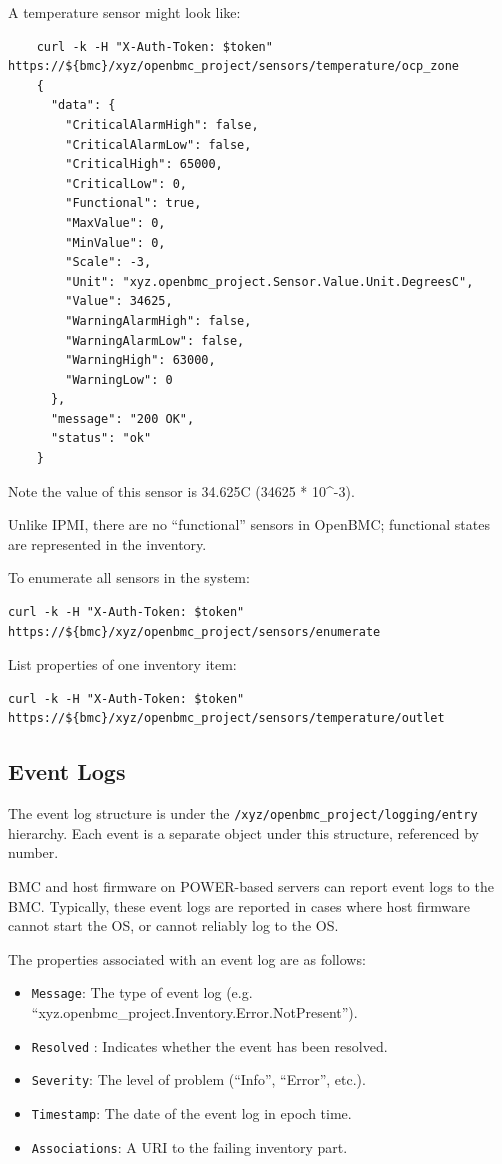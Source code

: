 A temperature sensor might look like:

\begin{verbatim}
    curl -k -H "X-Auth-Token: $token" https://${bmc}/xyz/openbmc_project/sensors/temperature/ocp_zone
    {
      "data": {
        "CriticalAlarmHigh": false,
        "CriticalAlarmLow": false,
        "CriticalHigh": 65000,
        "CriticalLow": 0,
        "Functional": true,
        "MaxValue": 0,
        "MinValue": 0,
        "Scale": -3,
        "Unit": "xyz.openbmc_project.Sensor.Value.Unit.DegreesC",
        "Value": 34625,
        "WarningAlarmHigh": false,
        "WarningAlarmLow": false,
        "WarningHigh": 63000,
        "WarningLow": 0
      },
      "message": "200 OK",
      "status": "ok"
    }
\end{verbatim}

Note the value of this sensor is 34.625C (34625 * 10\^{}-3).

Unlike IPMI, there are no ``functional'' sensors in OpenBMC; functional
states are represented in the inventory.

To enumerate all sensors in the system:

\begin{verbatim}
curl -k -H "X-Auth-Token: $token" https://${bmc}/xyz/openbmc_project/sensors/enumerate
\end{verbatim}

List properties of one inventory item:

\begin{verbatim}
curl -k -H "X-Auth-Token: $token" https://${bmc}/xyz/openbmc_project/sensors/temperature/outlet
\end{verbatim}

\hypertarget{event-logs}{%
\subsection{Event Logs}\label{event-logs}}

The event log structure is under the
\texttt{/xyz/openbmc\_project/logging/entry} hierarchy. Each event is a
separate object under this structure, referenced by number.

BMC and host firmware on POWER-based servers can report event logs to
the BMC. Typically, these event logs are reported in cases where host
firmware cannot start the OS, or cannot reliably log to the OS.

The properties associated with an event log are as follows:

\begin{itemize}
\tightlist
\item
  \texttt{Message}: The type of event log (e.g.
  ``xyz.openbmc\_project.Inventory.Error.NotPresent'').
\item
  \texttt{Resolved} : Indicates whether the event has been resolved.
\item
  \texttt{Severity}: The level of problem (``Info'', ``Error'', etc.).
\item
  \texttt{Timestamp}: The date of the event log in epoch time.
\item
  \texttt{Associations}: A URI to the failing inventory part.
\end{itemize}

